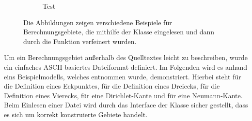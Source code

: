 \documentclass[crop=false,10pt,ngerman]{standalone}
\begin{document}
\begin{figure}[h]
\begin{subfigure}[b]{0.24\textwidth}
          \caption{Test}
        \end{subfigure}
        \caption[Subdivision von Testgebieten]{%
          Die Abbildungen zeigen verschiedene Beispiele für Berechnungsgebiete, die mithilfe der Klasse  eingelesen und dann durch die Funktion  verfeinert wurden.
        }
        \label{fig:model-subdivide}
      \end{figure}

      Um ein Berechnungsgebiet außerhalb des Quelltextes leicht zu beschreiben, wurde ein einfaches ASCII-basiertes Dateiformat definiert.
      Im Folgenden wird es anhand eins Beispielmodells, welches \cite{Alberty1998} entnommen wurde, demonstriert.
      Hierbei steht  für die Definition eines Eckpunktes,  für die Definition eines Dreiecks,  für die Definition eines Vierecks,  für eine Dirichlet-Kante und  für eine Neumann-Kante.
      Beim Einlesen einer Datei wird durch das Interface der Klasse  sicher gestellt, dass es sich um korrekt konstruierte Gebiete handelt.
\end{document}

